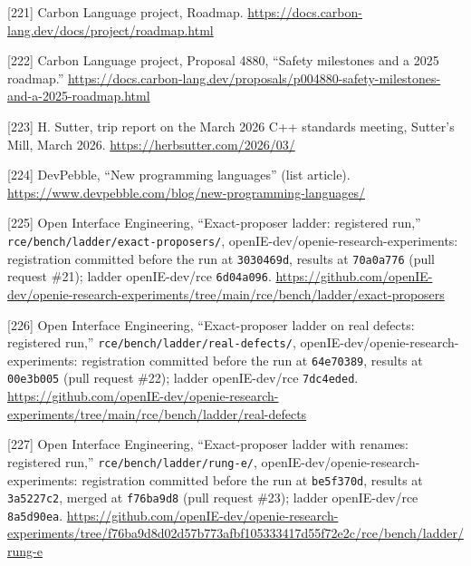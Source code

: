 \documentclass[10pt,letterpaper]{article}
\begin{document}
{[}221{]} Carbon Language project, Roadmap.
\url{https://docs.carbon-lang.dev/docs/project/roadmap.html}

{[}222{]} Carbon Language project, Proposal 4880, ``Safety milestones
and a 2025 roadmap.''
\url{https://docs.carbon-lang.dev/proposals/p004880-safety-milestones-and-a-2025-roadmap.html}

{[}223{]} H. Sutter, trip report on the March 2026 C++ standards
meeting, Sutter's Mill, March 2026.
\url{https://herbsutter.com/2026/03/}

{[}224{]} DevPebble, ``New programming languages'' (list article).
\url{https://www.devpebble.com/blog/new-programming-languages/}

{[}225{]} Open Interface Engineering, ``Exact-proposer ladder:
registered run,'' \texttt{rce/\allowbreak{}bench/\allowbreak{}ladder/\allowbreak{}exact-\allowbreak{}proposers/\allowbreak{}},
openIE-dev/openie-research-experiments: registration committed before
the run at \texttt{3030469d}, results at \texttt{70a0a776} (pull request
\#21); ladder openIE-dev/rce \texttt{6d04a096}.
\url{https://github.com/openIE-dev/openie-research-experiments/tree/main/rce/bench/ladder/exact-proposers}

{[}226{]} Open Interface Engineering, ``Exact-proposer ladder on real
defects: registered run,'' \texttt{rce/\allowbreak{}bench/\allowbreak{}ladder/\allowbreak{}real-\allowbreak{}defects/\allowbreak{}},
openIE-dev/openie-research-experiments: registration committed before
the run at \texttt{64e70389}, results at \texttt{00e3b005} (pull request
\#22); ladder openIE-dev/rce \texttt{7dc4eded}.
\url{https://github.com/openIE-dev/openie-research-experiments/tree/main/rce/bench/ladder/real-defects}

{[}227{]} Open Interface Engineering, ``Exact-proposer ladder with
renames: registered run,'' \texttt{rce/\allowbreak{}bench/\allowbreak{}ladder/\allowbreak{}rung-\allowbreak{}e/\allowbreak{}},
openIE-dev/openie-research-experiments: registration committed before
the run at \texttt{be5f370d}, results at \texttt{3a5227c2}, merged at
\texttt{f76ba9d8} (pull request \#23); ladder openIE-dev/rce
\texttt{8a5d90ea}.
\url{https://github.com/openIE-dev/openie-research-experiments/tree/f76ba9d8d02d57b773afbf105333417d55f72e2c/rce/bench/ladder/rung-e}
\end{document}
